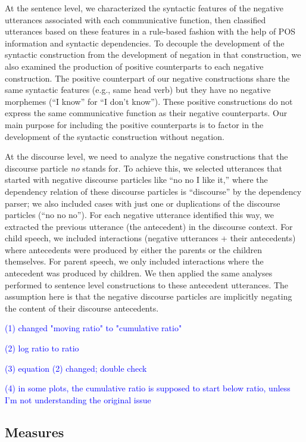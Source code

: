 \documentclass[
  english,
  man,floatsintext]{apa6}
\begin{document}
At the sentence level, we characterized the syntactic features of the negative utterances associated with each communicative function, then classified utterances based on these features in a rule-based fashion with the help of POS information and syntactic dependencies. To decouple the development of the syntactic construction from the development of negation in that construction, we also examined the production of positive counterparts to each negative construction. The positive counterpart of our negative constructions share the same syntactic features (e.g., same head verb) but they have no negative morphemes (``I know'' for ``I don't know''). These positive constructions do not express the same communicative function as their negative counterparts. Our main purpose for including the positive counterparts is to factor in the development of the syntactic construction without negation.

At the discourse level, we need to analyze the negative constructions that the discourse particle \emph{no} stands for. To achieve this, we selected utterances that started with negative discourse particles like ``no no I like it,'' where the dependency relation of these discourse particles is ``discourse'' by the dependency parser; we also included cases with just one or duplications of the discourse particles (``no no no''). For each negative utterance identified this way, we extracted the previous utterance (the antecedent) in the discourse context. For child speech, we included interactions (negative utterances + their antecedents) where antecedents were produced by either the parents or the children themselves. For parent speech, we only included interactions where the antecedent was produced by children. We then applied the same analyses performed to sentence level constructions to these antecedent utterances. The assumption here is that the negative discourse particles are implicitly negating the content of their discourse antecedents.

\textcolor{blue}{(1) changed "moving ratio" to "cumulative ratio"}

\textcolor{blue}{(2) log ratio to ratio}

\textcolor{blue}{(3) equation (2) changed; double check}

\textcolor{blue}{(4) in some plots, the cumulative ratio is supposed to start below ratio, unless I'm not understanding the original issue}

\hypertarget{measures}{%
\subsection{Measures}\label{measures}}
\end{document}
